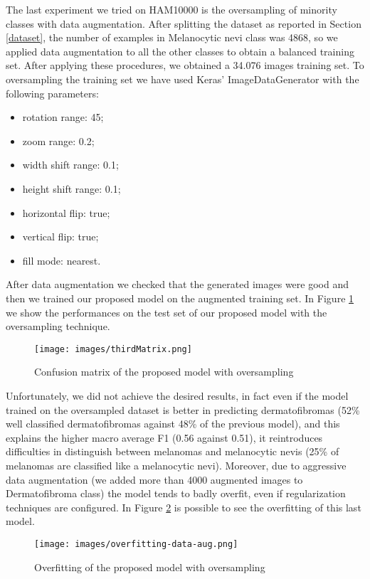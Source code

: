 		The last experiment we tried on HAM10000 is the oversampling of minority classes with data augmentation. After splitting the dataset as reported in Section \ref{dataset}, the number of examples in Melanocytic nevi class was 4868, so we applied data augmentation to all the other classes to obtain a balanced training set. After applying these procedures, we obtained a 34.076 images training set.
		To oversampling the training set we have used Keras' ImageDataGenerator with the following parameters:
		\begin{itemize}
			\item rotation range: 45; 
			\item zoom range: 0.2; 
			\item width shift range: 0.1;
			\item height shift range: 0.1;
			\item horizontal flip: true; 
			\item vertical flip: true;
			\item fill mode: nearest.
		\end{itemize}
		
		After data augmentation we checked that the generated images were good and then we trained our proposed model on the augmented training set.
		In Figure \ref{fig:third-matrix} we show the performances on the test set of our proposed model with the oversampling technique.
		
		\begin{figure}[H]
			\centering
			\texttt{[image: images/thirdMatrix.png]}
			\caption{Confusion matrix of the proposed model with oversampling}
			\label{fig:third-matrix}
		\end{figure}
		
		Unfortunately, we did not achieve the desired results, in fact even if the model trained on the oversampled dataset is better in predicting dermatofibromas (52\% well classified dermatofibromas against 48\% of the previous model), and this explains the higher macro average F1 (0.56 against 0.51), it reintroduces difficulties in distinguish between melanomas and melanocytic nevis (25\% of melanomas are classified like a melanocytic nevi). 
		Moreover, due to aggressive data augmentation (we added more than 4000 augmented images to Dermatofibroma class) the model tends to badly overfit, even if regularization techniques are configured. In Figure \ref{fig:overfitting-data-aug} is possible to see the overfitting of this last model.
		
		\begin{figure}[H]
			\centering
			\texttt{[image: images/overfitting-data-aug.png]}
			\caption{Overfitting of the proposed model with oversampling}
			\label{fig:overfitting-data-aug}
		\end{figure}
		
